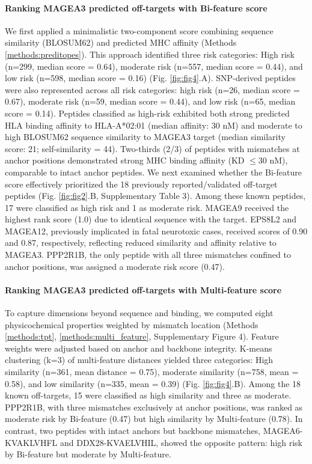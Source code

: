 \documentclass[times, twoside, watermark]{zHenriquesLab-StyleBioRxiv}
\begin{document}
            \paragraph{Ranking MAGEA3 predicted off-targets with Bi-feature score}
                We first applied a minimalistic two-component score combining sequence similarity (BLOSUM62) and predicted MHC affinity (Methods \ref{methods:preditopes}). This approach identified three risk categories: High risk (n=299, median score = 0.64), moderate risk (n=557, median score = 0.44), and low risk (n=598, median score = 0.16) (Fig. \ref{fig:fig4}.A). SNP-derived peptides were also represented across all risk categories: high risk (n=26, median score = 0.67), moderate risk (n=59, median score = 0.44), and low risk (n=65, median score = 0.14). Peptides classified as high-risk exhibited both strong predicted HLA binding affinity to HLA-A*02:01 (median affinity: 30 nM) and moderate to high BLOSUM62 sequence similarity to MAGEA3 target (median similarity score: 21; self-similarity = 44). Two-thirds (2/3) of peptides with mismatches at anchor positions demonstrated strong MHC binding affinity (KD $\leq$30 nM), comparable to intact anchor peptides.
                We next examined whether the Bi-feature score effectively prioritized the 18 previously reported/validated off-target peptides (Fig. \ref{fig:fig2}.B, Supplementary Table 3). Among these known peptides, 17 were classified as high risk and 1 as moderate risk. MAGEA9 received the highest rank score (1.0) due to identical sequence with the target. EPS8L2 and MAGEA12, previously implicated in fatal neurotoxic cases, received scores of 0.90 and 0.87, respectively, reflecting reduced similarity and affinity relative to MAGEA3. PPP2R1B, the only peptide with all three mismatches confined to anchor positions, was assigned a moderate risk score (0.47). 
            
            \paragraph{Ranking MAGEA3 predicted off-targets with Multi-feature score}
                To capture dimensions beyond sequence and binding, we computed eight physicochemical properties weighted by mismatch location (Methods \ref{methods:tpt}, \ref{methods:multi_feature}, Supplementary Figure 4). Feature weights were adjusted based on anchor and backbone integrity. K-means clustering (k=3) of multi-feature distances yielded three categories: High similarity (n=361, mean distance = 0.75), moderate similarity (n=758, mean = 0.58), and low similarity (n=335, mean = 0.39) (Fig. \ref{fig:fig4}.B). 
                Among the 18 known off-targets, 15 were classified as high similarity and three as moderate. PPP2R1B, with three mismatches exclusively at anchor positions, was ranked as moderate risk by Bi-feature (0.47) but high similarity by Multi-feature (0.78). In contrast, two peptides with intact anchors but backbone mismatches, MAGEA6-KVAKLVHFL and DDX28-KVAELVHIL, showed the opposite pattern: high risk by Bi-feature but moderate by Multi-feature.
\end{document}
